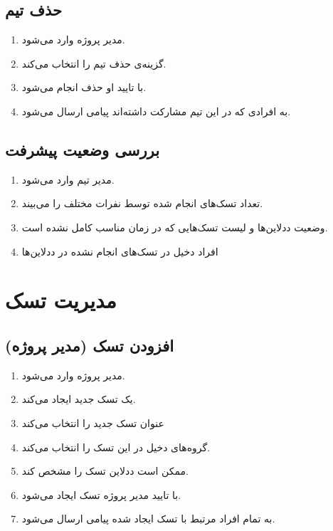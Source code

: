 \documentclass[10pt,a4paper]{article}
\begin{document}
\subsection{
حذف تیم
}

\begin{enumerate}
	\item 
	مدیر پروژه وارد می‌شود.
	\item
	گزینه‌ی حذف تیم را انتخاب می‌کند.
	\item
	با تایید او حذف انجام می‌شود.
	\item
	به افرادی که در این تیم مشارکت داشته‌اند پیامی ارسال می‌شود.
\end{enumerate}


\subsection{
بررسی وضعیت پیشرفت
}

\begin{enumerate}
	\item 
	مدیر تیم وارد می‌شود.
	\item
	تعداد تسک‌های انجام شده توسط نفرات مختلف را می‌بیند.
	\item
	وضعیت ددلاین‌ها و لیست تسک‌هایی که در زمان مناسب کامل نشده است.
	\item
	افراد دخیل در تسک‌های انجام نشده در ددلاین‌ها
\end{enumerate}


	\section{
	مدیریت تسک
}
\subsection{
افزودن تسک (مدیر پروژه)
}
\begin{enumerate}
	\item 
	 مدیر پروژه وارد می‌شود.
	 \item
	 یک تسک جدید ایجاد می‌کند.
	 \item
	 عنوان تسک جدید را انتخاب می‌کند
	 \item
	 گروه‌های دخیل در این تسک را انتخاب می‌کند.
	 \item
	 ممکن است ددلاین تسک را مشخص کند.
	 \item
	 با تایید مدیر پروژه تسک ایجاد می‌شود.
	 \item
	 به تمام افراد مرتبط با تسک ایجاد شده پیامی ارسال می‌شود.
\end{enumerate}
\end{document}
